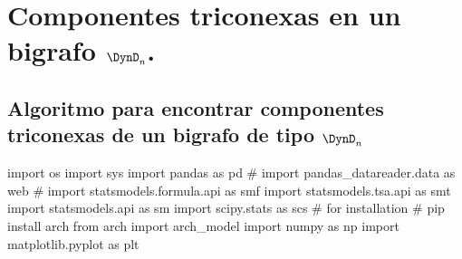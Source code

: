 \chapter{Componentes triconexas en un bigrafo $\DynD_{n}$.}

\section{Algoritmo para encontrar componentes triconexas de un bigrafo de tipo $\DynD_{n}$}

\begin{python}
import os
import sys
import pandas as pd
# import pandas_datareader.data as web
# import statsmodels.formula.api as smf
import statsmodels.tsa.api as smt
import statsmodels.api as sm
import scipy.stats as scs
# for installation
# pip install arch
from arch import arch_model
import numpy as np
import matplotlib.pyplot as plt
\end{python}